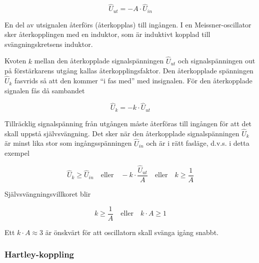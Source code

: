 \[\hat{U}_{ut} = -A \cdot \hat{U}_{in}\]

En del av utsignalen återförs (återkopplas) till ingången. I en
Meissner-oscillator sker återkopplingen med en induktor, som är
induktivt kopplad till svängningskretsens induktor.

Kvoten \(k\) mellan den återkopplade signalspänningen \(\hat{U}_{ut}\) och
signalspänningen out på förstärkarens utgång kallas
återkopplingsfaktor. Den återkopplade spänningen \(\hat{U}_k\) fasvrids så
att den kommer ``i fas med'' med insignalen. För den återkopplade
signalen fås då sambandet

\[\hat{U}_k = -k \cdot \hat{U}_{ut}\]

Tillräcklig signalspänning från utgången måste återföras till ingången
för att det skall uppstå självsvängning. Det sker när den återkopplade
signalspänningen \(\hat{U}_k\) är minst lika stor som
ingångsspänningen \(\hat{U}_{in}\) och är i rätt fasläge, d.v.s. i
detta exempel

\[
\hat{U}_k \geq \hat{U}_{in}
\quad \text{eller} \quad
-k \cdot \frac{\hat{U}_{ut}}{A}
\quad \text{eller} \quad
k \geq \frac{1}{A}
\]

Självsvängningsvillkoret blir

\[
k \geq \frac{1}{A}
\quad \text{eller} \quad
k \cdot A \geq 1
\]

Ett \(k \cdot A \approx 3\) är önskvärt för att oscillatorn skall
svänga igång snabbt.

\subsubsection{Hartley-koppling}

